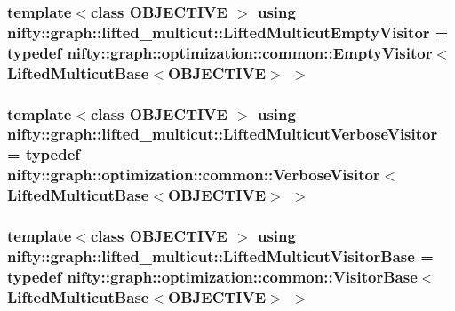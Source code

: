\subsubsection[{Lifted\+Multicut\+Empty\+Visitor}]{\setlength{\rightskip}{0pt plus 5cm}template$<$class O\+B\+J\+E\+C\+T\+I\+V\+E $>$ using {\bf nifty\+::graph\+::lifted\+\_\+multicut\+::\+Lifted\+Multicut\+Empty\+Visitor} = typedef {\bf nifty\+::graph\+::optimization\+::common\+::\+Empty\+Visitor}$<$ {\bf Lifted\+Multicut\+Base}$<$O\+B\+J\+E\+C\+T\+I\+V\+E$>$ $>$}\label{namespacenifty_1_1graph_1_1lifted__multicut_ae8d3a07757ca6e27f2ea6ffc810c8a75}
\hypertarget{namespacenifty_1_1graph_1_1lifted__multicut_a1f2e6a84e0ecc2118bb2c5d73c752cbe}{}
\subsubsection[{Lifted\+Multicut\+Verbose\+Visitor}]{\setlength{\rightskip}{0pt plus 5cm}template$<$class O\+B\+J\+E\+C\+T\+I\+V\+E $>$ using {\bf nifty\+::graph\+::lifted\+\_\+multicut\+::\+Lifted\+Multicut\+Verbose\+Visitor} = typedef {\bf nifty\+::graph\+::optimization\+::common\+::\+Verbose\+Visitor}$<$ {\bf Lifted\+Multicut\+Base}$<$O\+B\+J\+E\+C\+T\+I\+V\+E$>$ $>$}\label{namespacenifty_1_1graph_1_1lifted__multicut_a1f2e6a84e0ecc2118bb2c5d73c752cbe}
\hypertarget{namespacenifty_1_1graph_1_1lifted__multicut_a0bb4a638bd7a5b2b2f64a9be0df46775}{}
\subsubsection[{Lifted\+Multicut\+Visitor\+Base}]{\setlength{\rightskip}{0pt plus 5cm}template$<$class O\+B\+J\+E\+C\+T\+I\+V\+E $>$ using {\bf nifty\+::graph\+::lifted\+\_\+multicut\+::\+Lifted\+Multicut\+Visitor\+Base} = typedef {\bf nifty\+::graph\+::optimization\+::common\+::\+Visitor\+Base}$<$ {\bf Lifted\+Multicut\+Base}$<$O\+B\+J\+E\+C\+T\+I\+V\+E$>$ $>$}\label{namespacenifty_1_1graph_1_1lifted__multicut_a0bb4a638bd7a5b2b2f64a9be0df46775}
\hypertarget{namespacenifty_1_1graph_1_1lifted__multicut_ae0f8360a0bdf9d1caa577c1889fda20c}{}
